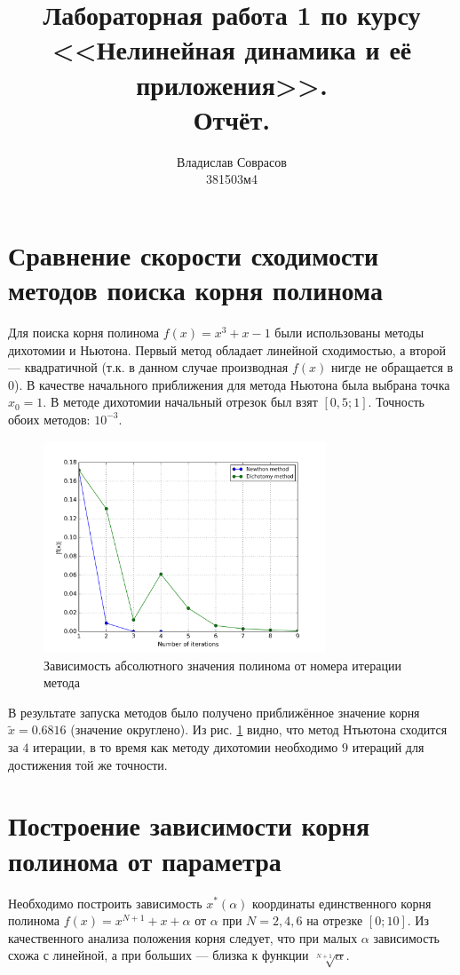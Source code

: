 \documentclass[a4paper]{article}
\begin{document}
\title{Лабораторная работа 1 по курсу <<Нелинейная динамика и её приложения>>. \\Отчёт.}
\author{Владислав Соврасов\\ 381503м4}
\date{}
\maketitle

\section{Сравнение скорости сходимости методов поиска корня полинома}
Для поиска корня полинома \(f(x)=x^3+x-1\) были использованы методы дихотомии и
Ньютона. Первый метод обладает линейной сходимостью, а второй --- квадратичной
(т.к. в данном случае производная \(f(x)\) нигде не обращается в \(0\)).
В качестве начального приближения для метода Ньютона была
выбрана точка \(x_0=1\). В методе дихотомии начальный отрезок был взят \([0,5;1]\).
Точность обоих методов: \(10^{-3}\).

\begin{figure}[ht]
	\center
  \includegraphics[width=0.75\textwidth]{../pictures/lab1_convergence.png}
  \caption{Зависимость абсолютного значения полинома от номера итерации метода}
  \label{fig:convergence}
\end{figure}

В результате запуска методов было получено приближённое значение корня
\(\widetilde{x}=0.6816\) (значение округлено). Из рис. \ref{fig:convergence} видно, что метод Нтьютона
сходится за \(4\) итерации, в то время как методу дихотомии необходимо \(9\) итераций для
достижения той же точности.

\section{Построение зависимости корня полинома от параметра}
Необходимо построить зависимость \(x^*(\alpha)\) координаты единственного корня полинома
\(f(x)=x^{N+1}+x+\alpha\) от \(\alpha\) при \(N=2,4,6\) на отрезке \([0;10]\).
Из качественного анализа положения корня следует, что при малых \(\alpha\) зависимость
схожа с линейной, а при больших --- близка к функции \(\sqrt[N+1]{\alpha}\).
\end{document}

